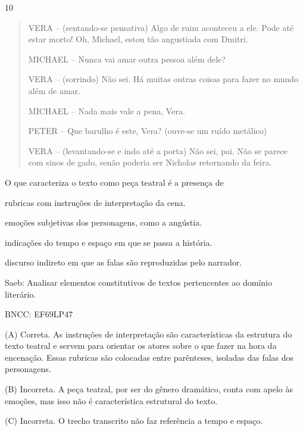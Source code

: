 \num{10}

\begin{quote}
VERA -- (sentando-se pensativa) Algo de ruim aconteceu a ele. Pode até
estar morto! Oh, Michael, estou tão angustiada com Dmitri.

MICHAEL -- Nunca vai amar outra pessoa além dele?

VERA -- (sorrindo) Não sei. Há muitas outras coisas para fazer no mundo
além de amar.

MICHAEL -- Nada mais vale a pena, Vera.

PETER -- Que barulho é este, Vera? (ouve-se um ruído metálico)

VERA -- (levantando-se e indo até a porta) Não sei, pai. Não se parece
com sinos de gado, senão poderia ser Nicholas retornando da feira.
\end{quote}


O que caracteriza o texto como peça teatral é a presença de

\begin{escolha}
\item rubricas com instruções de interpretação da cena.

\item emoções subjetivas dos personagens, como a angústia.

\item indicações do tempo e espaço em que se passa a história.

\item discurso indireto em que as falas são reproduzidas pelo narrador.
\end{escolha}

Saeb: Analisar elementos constitutivos de textos pertencentes ao domínio
literário.

BNCC: EF69LP47

(A) Correta. As instruções de interpretação são características da
estrutura do texto teatral e servem para orientar os atores sobre o que
fazer na hora da encenação. Essas rubricas são colocadas entre
parênteses, isoladas das falas dos personagens.

(B) Incorreta. A peça teatral, por ser do gênero dramático, conta com
apelo às emoções, mas isso não é característica estrutural do texto.

(C) Incorreta. O trecho transcrito não faz referência a tempo e espaço.

